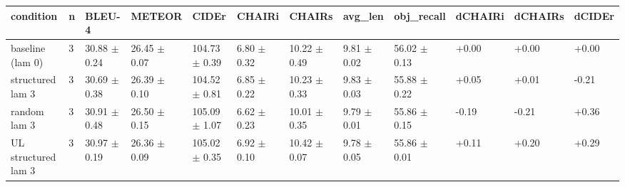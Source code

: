 \begin{tabular}{llllllllllll}
\hline
condition & n & BLEU-4 & METEOR & CIDEr & CHAIRi & CHAIRs & avg\_len & obj\_recall & dCHAIRi & dCHAIRs & dCIDEr \\
\hline
baseline (lam 0) & 3 & 30.88 $\pm$ 0.24 & 26.45 $\pm$ 0.07 & 104.73 $\pm$ 0.39 & 6.80 $\pm$ 0.32 & 10.22 $\pm$ 0.49 & 9.81 $\pm$ 0.02 & 56.02 $\pm$ 0.13 & +0.00 & +0.00 & +0.00 \\
structured lam 3 & 3 & 30.69 $\pm$ 0.38 & 26.39 $\pm$ 0.10 & 104.52 $\pm$ 0.81 & 6.85 $\pm$ 0.22 & 10.23 $\pm$ 0.33 & 9.83 $\pm$ 0.03 & 55.88 $\pm$ 0.22 & +0.05 & +0.01 & -0.21 \\
random lam 3 & 3 & 30.91 $\pm$ 0.48 & 26.50 $\pm$ 0.15 & 105.09 $\pm$ 1.07 & 6.62 $\pm$ 0.23 & 10.01 $\pm$ 0.35 & 9.79 $\pm$ 0.01 & 55.86 $\pm$ 0.15 & -0.19 & -0.21 & +0.36 \\
UL structured lam 3 & 3 & 30.97 $\pm$ 0.19 & 26.36 $\pm$ 0.09 & 105.02 $\pm$ 0.35 & 6.92 $\pm$ 0.10 & 10.42 $\pm$ 0.07 & 9.78 $\pm$ 0.05 & 55.86 $\pm$ 0.01 & +0.11 & +0.20 & +0.29 \\
\hline
\end{tabular}

